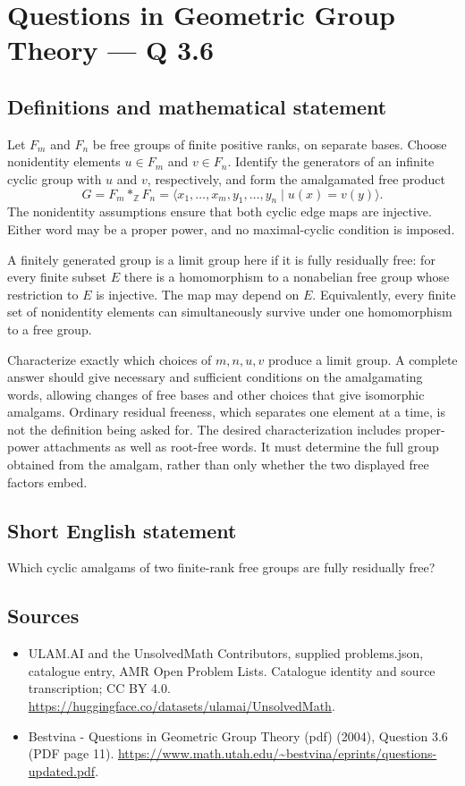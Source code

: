 \documentclass[11pt,a4paper]{article}
\begin{document}
\section*{Questions in Geometric Group Theory — Q 3.6}\label{statement}

\subsection{Definitions and mathematical statement}
Let $F_m$ and $F_n$ be free groups of finite positive ranks, on separate bases. Choose nonidentity elements $u\in F_m$ and $v\in F_n$. Identify the generators of an infinite cyclic group with $u$ and $v$, respectively, and form the amalgamated free product
\[
 G=F_m*_{\mathbb Z}F_n
   =\langle x_1,\ldots,x_m,y_1,\ldots,y_n\mid u(x)=v(y)\rangle.
\]
The nonidentity assumptions ensure that both cyclic edge maps are injective. Either word may be a proper power, and no maximal-cyclic condition is imposed.

A finitely generated group is a limit group here if it is fully residually free: for every finite subset $E$ there is a homomorphism to a nonabelian free group whose restriction to $E$ is injective. The map may depend on $E$. Equivalently, every finite set of nonidentity elements can simultaneously survive under one homomorphism to a free group.

Characterize exactly which choices of $m,n,u,v$ produce a limit group. A complete answer should give necessary and sufficient conditions on the amalgamating words, allowing changes of free bases and other choices that give isomorphic amalgams. Ordinary residual freeness, which separates one element at a time, is not the definition being asked for. The desired characterization includes proper-power attachments as well as root-free words. It must determine the full group obtained from the amalgam, rather than only whether the two displayed free factors embed.
\subsection{Short English statement}
Which cyclic amalgams of two finite-rank free groups are fully residually free?
\subsection{Sources}
\begin{itemize}
\item[S1] ULAM.AI and the UnsolvedMath Contributors, supplied problems.json, catalogue entry, AMR Open Problem Lists. Catalogue identity and source transcription; CC BY 4.0.
\url{https://huggingface.co/datasets/ulamai/UnsolvedMath}.
\item[S2] Bestvina - Questions in Geometric Group Theory (pdf) (2004), Question 3.6 (PDF page 11). 
\url{https://www.math.utah.edu/~bestvina/eprints/questions-updated.pdf}.
\end{itemize}
\end{document}
